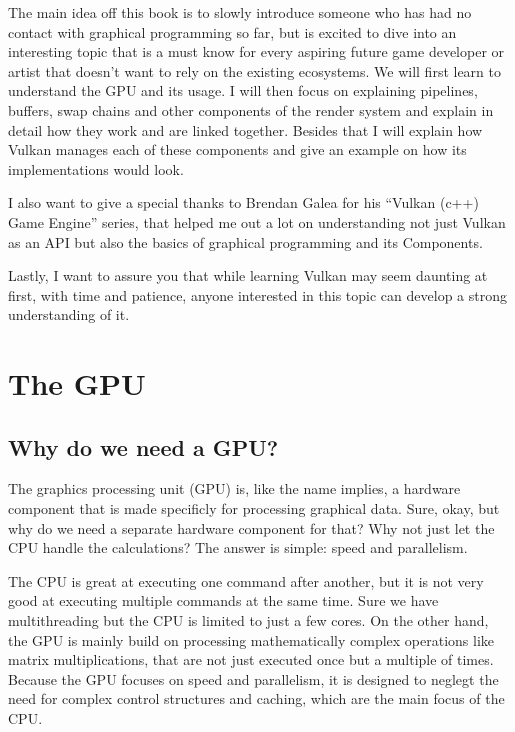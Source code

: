 \documentclass[12pt]{report} \usepackage{preamble}
\begin{document}
The main idea off this book is to slowly introduce someone who has had
no contact with graphical programming so far, but is excited to dive
into an interesting topic that is a must know for every aspiring future
game developer or artist that doesn’t want to rely on the existing
ecosystems. We will first learn to understand the GPU and its usage. I
will then focus on explaining pipelines, buffers, swap chains and other
components of the render system and explain in detail how they work
and are linked together. Besides that I will explain how Vulkan manages
each of these components and give an example on how its implementations
would look.

I also want to give a special thanks to Brendan Galea for his “Vulkan
(c++) Game Engine” series, that helped me out a lot on understanding
not just Vulkan as an API but also the basics of graphical programming
and its Components.

Lastly, I want to assure you that while learning Vulkan may seem daunting
at first, with time and patience, anyone interested in this topic can
develop a strong understanding of it.

\chapter{The GPU}

\section{Why do we need a GPU?}

The graphics processing unit (GPU) is, like the name implies, a hardware
component that is made specificly for processing graphical data. Sure,
okay, but why do we need a separate hardware component for that?  Why not
just let the CPU handle the calculations? The answer is simple: speed
and parallelism.

The CPU is great at executing one command after another, but
it is not very good at executing multiple commands at the same
time. Sure we have multithreading but the CPU is limited to just a
few cores. \cite{CDW-cpu_vs_gpu} On the other hand, the GPU is mainly
build on processing mathematically complex operations like matrix
multiplications, that are not just executed once but a multiple
of times. \cite{NVIDIA-cpu-gpu} Because the GPU focuses on speed
and parallelism, it is designed to neglegt the need for complex
control structures and caching, which are the main focus of the
CPU. \cite{CUDA_Programming_Guide}
\end{document}
